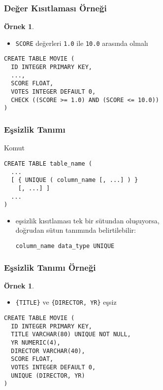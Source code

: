 \documentclass[dvipsnames]{beamer}
\theoremstyle{definition}
\theoremstyle{example}
\newtheorem{ornek}[theorem]{Örnek}
\theoremstyle{plain}
\begin{document}
\begin{frame}[fragile]
  \frametitle{Değer Kısıtlaması Örneği}

  \begin{ornek}
    \begin{itemize}
      \item \texttt{SCORE} değerleri \texttt{1.0} ile \texttt{10.0} arasında
        olmalı
    \end{itemize}

    \begin{lstlisting}
CREATE TABLE MOVIE (
  ID INTEGER PRIMARY KEY,
  ...,
  SCORE FLOAT,
  VOTES INTEGER DEFAULT 0,
  CHECK ((SCORE >= 1.0) AND (SCORE <= 10.0))
)
    \end{lstlisting}
  \end{ornek}
\end{frame}

\begin{frame}[fragile]
  \frametitle{Eşsizlik Tanımı}

  \begin{block}{Komut}
    \begin{lstlisting}
CREATE TABLE table_name (
  ...
  [ { UNIQUE ( column_name [, ...] ) }
    [, ...] ]
  ...
)
    \end{lstlisting}
  \end{block}

  \pause
  \begin{itemize}
    \item eşsizlik kısıtlaması tek bir sütundan oluşuyorsa,\\
      doğrudan sütun tanımında belirtilebilir:
      \begin{lstlisting}
column_name data_type UNIQUE
      \end{lstlisting}
  \end{itemize}
\end{frame}

\begin{frame}[fragile]
  \frametitle{Eşsizlik Tanımı Örneği}

  \begin{ornek}
    \begin{itemize}
      \item \texttt{\{TITLE\}} ve \texttt{\{DIRECTOR, YR\}} eşsiz
    \end{itemize}

    \begin{lstlisting}
CREATE TABLE MOVIE (
  ID INTEGER PRIMARY KEY,
  TITLE VARCHAR(80) UNIQUE NOT NULL,
  YR NUMERIC(4),
  DIRECTOR VARCHAR(40),
  SCORE FLOAT,
  VOTES INTEGER DEFAULT 0,
  UNIQUE (DIRECTOR, YR)
)
    \end{lstlisting}
  \end{ornek}
\end{frame}
\end{document}
